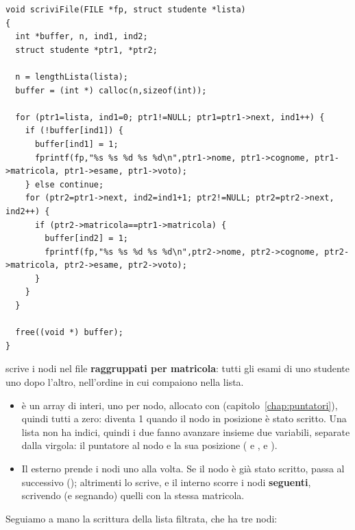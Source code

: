 \begingroup
\codicepiccolo
\lstset{xleftmargin=19pt, framexleftmargin=15pt}
\begin{lstlisting}[style=c, name=funzioni.c, firstnumber=116]
void scriviFile(FILE *fp, struct studente *lista)
{
  int *buffer, n, ind1, ind2;
  struct studente *ptr1, *ptr2;

  n = lengthLista(lista);
  buffer = (int *) calloc(n,sizeof(int));

  for (ptr1=lista, ind1=0; ptr1!=NULL; ptr1=ptr1->next, ind1++) {
    if (!buffer[ind1]) {
      buffer[ind1] = 1;
      fprintf(fp,"%s %s %d %s %d\n",ptr1->nome, ptr1->cognome, ptr1->matricola, ptr1->esame, ptr1->voto);
    } else continue;
    for (ptr2=ptr1->next, ind2=ind1+1; ptr2!=NULL; ptr2=ptr2->next, ind2++) {
      if (ptr2->matricola==ptr1->matricola) {
        buffer[ind2] = 1;
        fprintf(fp,"%s %s %d %s %d\n",ptr2->nome, ptr2->cognome, ptr2->matricola, ptr2->esame, ptr2->voto);
      }
    }
  }

  free((void *) buffer);
}
\end{lstlisting}
\endgroup

 scrive i nodi nel file \textbf{raggruppati per matricola}:
tutti gli esami di uno studente uno dopo l'altro, nell'ordine in cui
compaiono nella lista.

\begin{itemize}
  \item {} è un array di  interi, uno per nodo, allocato
        con  (capitolo~\ref{chap:puntatori}), quindi tutti a
        zero:  diventa 1 quando il nodo in posizione
         è stato scritto. Una lista non ha indici, quindi i due
         fanno avanzare insieme due variabili, separate dalla
        virgola: il puntatore al nodo e la sua posizione ( e
        ,  e ).
  \item Il  esterno prende i nodi uno alla volta. Se il nodo è già
        stato scritto, passa al successivo (); altrimenti lo
        scrive, e il  interno scorre i nodi \textbf{seguenti},
        scrivendo (e segnando) quelli con la stessa matricola.
\end{itemize}

Seguiamo a mano la scrittura della lista filtrata, che ha tre nodi:

